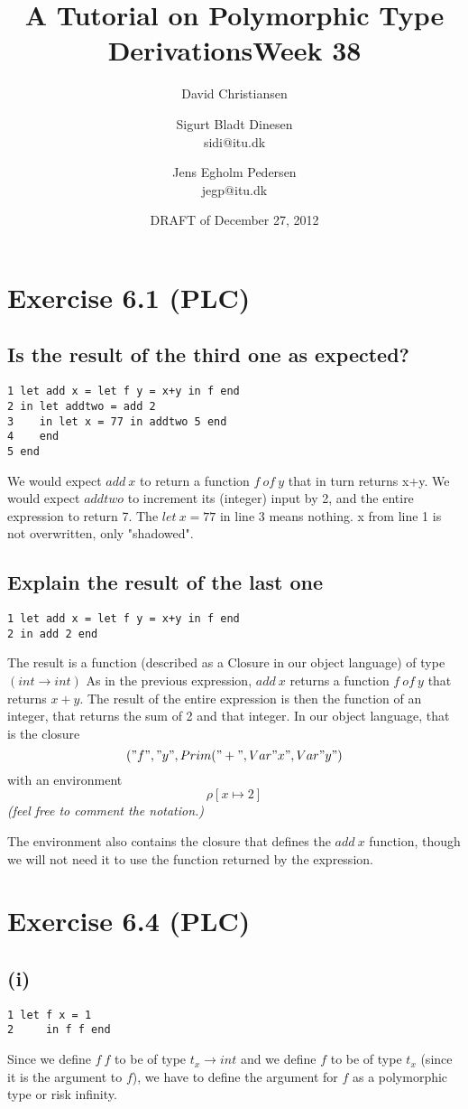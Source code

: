 \documentclass[a4paper]{article}
\title{A Tutorial on Polymorphic Type Derivations}
\author{David Christiansen}
\date{DRAFT of December 27, 2012}
\begin{document}
\title{Week 38}
\author{Sigurt Bladt Dinesen \\sidi{@}itu.dk \and Jens Egholm Pedersen \\jegp{@}itu.dk}
\maketitle
\section*{Exercise 6.1 (PLC)}
\subsection*{Is the result of the third one as expected?}
\begin{verbatim}
1 let add x = let f y = x+y in f end
2 in let addtwo = add 2
3    in let x = 77 in addtwo 5 end
4    end
5 end
\end{verbatim}
We would expect $add\ x$ to return a function $f\ of\ y$ that in turn returns x+y.
We would expect $addtwo$ to increment its (integer) input by 2, and the entire expression
to return 7.
The $let\ x = 77$ in line 3 means nothing. x from line 1 is not overwritten, only "shadowed".

\subsection*{Explain the result of the last one}
\begin{verbatim}
1 let add x = let f y = x+y in f end
2 in add 2 end
\end{verbatim}
The result is a function (described as a Closure in our object language) of
type $(int \to int)$ As in the previous expression, $add\ x$ returns a function
$f\ of\ y$ that returns $x+y$. The result of the entire expression is then the
function of an integer, that returns the sum of 2 and that integer.
In our object language, that is the closure
$$("f","y", Prim("+", Var "x", Var "y")$$
with an environment $$\rho [x \mapsto 2]$$
\textit{\small{(feel free to comment the notation.)}}

The environment also contains the closure that defines the $add\ x$ function,
though we will not need it to use the function returned by the expression.

\section*{Exercise 6.4 (PLC)}
\subsection*{(i)}
\begin{verbatim}
1 let f x = 1
2     in f f end
\end{verbatim}
Since we define $f\ f$ to be of type $t_x \to int$ and we define $f$ to be of type $t_x$ (since it is the argument to $f$), we have to define the argument for $f$ as a polymorphic type or risk infinity.
\\
\end{document}
